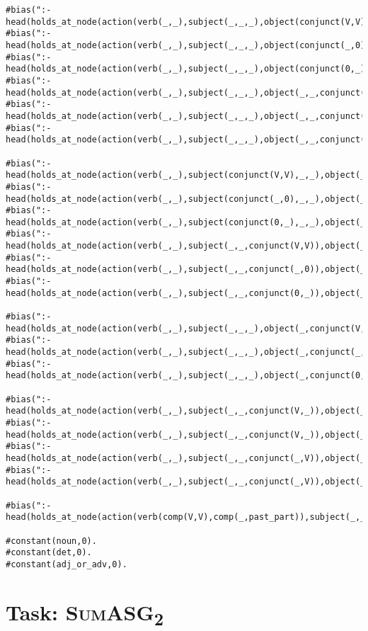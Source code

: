 \begin{lstlisting}
#bias(":- head(holds_at_node(action(verb(_,_),subject(_,_,_),object(conjunct(V,V),_,_)),var__(1))).").
#bias(":- head(holds_at_node(action(verb(_,_),subject(_,_,_),object(conjunct(_,0),_,_)),var__(1))).").
#bias(":- head(holds_at_node(action(verb(_,_),subject(_,_,_),object(conjunct(0,_),_,_)),var__(1))).").
#bias(":- head(holds_at_node(action(verb(_,_),subject(_,_,_),object(_,_,conjunct(V,V))),var__(1))).").
#bias(":- head(holds_at_node(action(verb(_,_),subject(_,_,_),object(_,_,conjunct(_,0))),var__(1))).").
#bias(":- head(holds_at_node(action(verb(_,_),subject(_,_,_),object(_,_,conjunct(0,_))),var__(1))).").

#bias(":- head(holds_at_node(action(verb(_,_),subject(conjunct(V,V),_,_),object(_,_,_)),var__(1))).").
#bias(":- head(holds_at_node(action(verb(_,_),subject(conjunct(_,0),_,_),object(_,_,_)),var__(1))).").
#bias(":- head(holds_at_node(action(verb(_,_),subject(conjunct(0,_),_,_),object(_,_,_)),var__(1))).").
#bias(":- head(holds_at_node(action(verb(_,_),subject(_,_,conjunct(V,V)),object(_,_,_)),var__(1))).").
#bias(":- head(holds_at_node(action(verb(_,_),subject(_,_,conjunct(_,0)),object(_,_,_)),var__(1))).").
#bias(":- head(holds_at_node(action(verb(_,_),subject(_,_,conjunct(0,_)),object(_,_,_)),var__(1))).").

#bias(":- head(holds_at_node(action(verb(_,_),subject(_,_,_),object(_,conjunct(V,V),_)),var__(1))).").
#bias(":- head(holds_at_node(action(verb(_,_),subject(_,_,_),object(_,conjunct(_,0),_)),var__(1))).").
#bias(":- head(holds_at_node(action(verb(_,_),subject(_,_,_),object(_,conjunct(0,_),_)),var__(1))).").

#bias(":- head(holds_at_node(action(verb(_,_),subject(_,_,conjunct(V,_)),object(_,_,conjunct(V,_))),var__(1))).").
#bias(":- head(holds_at_node(action(verb(_,_),subject(_,_,conjunct(V,_)),object(_,_,conjunct(_,V))),var__(1))).").
#bias(":- head(holds_at_node(action(verb(_,_),subject(_,_,conjunct(_,V)),object(_,_,conjunct(V,_))),var__(1))).").
#bias(":- head(holds_at_node(action(verb(_,_),subject(_,_,conjunct(_,V)),object(_,_,conjunct(_,V))),var__(1))).").

#bias(":- head(holds_at_node(action(verb(comp(V,V),comp(_,past_part)),subject(_,_,_),object(0,0,0)),var__(1))).").

#constant(noun,0).
#constant(det,0).
#constant(adj_or_adv,0).
\end{lstlisting}

\vspace{5pt}

\section{Task: \textsc{SumASG\textsubscript{2}}}
\label{sec:appendix_asg_2}

